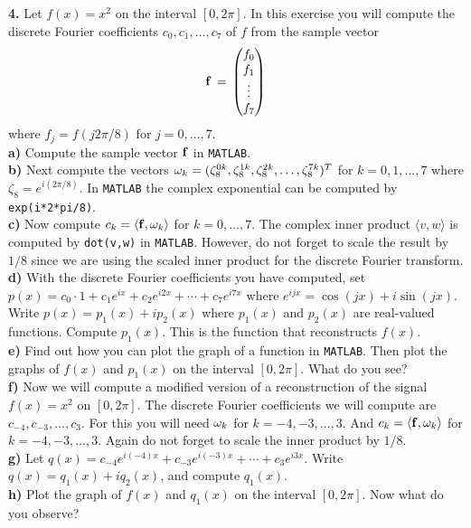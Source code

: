 \documentclass[11pt]{amsart}
\theoremstyle{definition}  %
\begin{document}
\noindent
{\bf 4.} Let $f(x)  = x^2$ on the interval $[0,2\pi]$. In this exercise you will compute the discrete Fourier coefficients  $c_0, c_1, \ldots, c_7$ of $f$ from the sample vector
$$ {\bf f} \, = \, \begin{pmatrix} f_0 \\ f_1 \\ \vdots \\ f_7 \end{pmatrix}$$
where $f_j = f(j2\pi/8)$ for $j=0,\ldots, 7$. \\
{\bf a)} Compute the sample vector ${\bf f}$ in {\tt MATLAB}. \\
{\bf b)} Next compute the vectors ${\bf \omega}_k  = (\zeta_8^{0k}, \zeta_8^{1k}, \zeta_8^{2k}, \ldots, \zeta_8^{7k})^T$ for $k=0,1, \ldots, 7$ where $\zeta_8 = e^{i(2\pi/8)}$.
In {\tt MATLAB} the complex exponential can be computed by {\tt exp(i*2*pi/8)}.\\
{\bf c)} Now compute $c_k = \langle {\bf f}, {\bf \omega}_k \rangle$ for $k=0, \ldots, 7$. The complex inner product $\langle v, w \rangle$ is computed by {\tt dot(v,w)} in {\tt MATLAB}.
However, do not forget to scale the result by $1/8$ since we are using the scaled inner product for the discrete Fourier transform. \\
{\bf d)} With the discrete Fourier coefficients you have computed, set $p(x) = c_0 \cdot 1 + c_1 e^{ix} + c_2 e^{i2x} + \cdots + c_7 e^{i7x}$ where $e^{ijx} = \cos(jx) + i \sin(jx)$.
Write $p(x) = p_1(x) + i p_2(x)$ where $p_1(x)$ and $p_2(x)$ are real-valued functions. Compute $p_1(x)$. This is the function that reconstructs $f(x)$. \\
{\bf e)} Find out how you can plot the graph of a function in {\tt MATLAB}. Then plot the graphs of $f(x)$ and $p_1(x)$ on the interval $[0,2\pi]$. What do you see? \\
{\bf f)} Now we will compute a modified version of a reconstruction of the signal $f(x) = x^2$ on $[0,2\pi]$.  The discrete Fourier coefficients we will compute are $c_{-4}, c_{-3}, \ldots, c_3$.
For this you will need ${\bf \omega}_k$ for $k=-4, -3, \ldots, 3$. And $c_k = \langle {\bf f}, {\bf \omega}_k \rangle$ for $k=-4, -3, \ldots, 3$. Again do not forget to scale the inner product by
$1/8$. \\
{\bf g)} Let $q(x) = c_{-4} e^{i(-4)x} + c_{-3} e^{i(-3)x} + \cdots + c_3 e^{i3x}$. Write $q(x)  = q_1(x) + i q_2(x)$, and compute $q_1(x)$. \\
{\bf h)} Plot the graph of $f(x)$ and $q_1(x)$ on the interval $[0,2\pi]$. Now what do you observe? 






 
\end{document}
